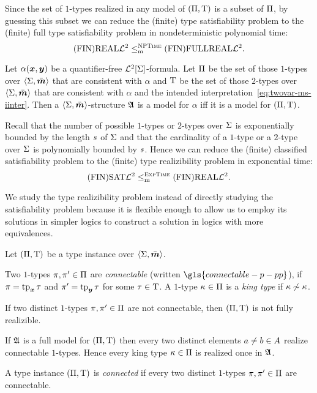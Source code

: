 \begin{remark}\label{rem:red-real-to-full-real}
Since the set of $1$-types realized in any model of $(\Pi,\mathrm{T})$ is a subset
of $\Pi$, by guessing this subset we can reduce the (finite) type
satisfiability problem to the (finite) full type satisfiability problem in
nondeterministic polynomial time:
\[
  \mathrm{(FIN)REAL}\mathcal{L}^{2} \leq_{\mathrm{m}}^{\text{\normalfont{\scshape NPTime}}} \mathrm{(FIN)FULLREAL}\mathcal{L}^{2}.
\]
\end{remark}

\begin{remark}\label{rem:red-sat-to-real}
Let $\alpha(\bm{x},\bm{y})$ be a quantifier-free $\mathcal{L}^{2}[\mathrm{\Sigma}]$-formula. Let $\Pi$ be
the set of those $1$-types over $\left\langle \mathrm{\Sigma},\bar{\bm{m}} \right\rangle$ that are consistent with
$\alpha$ and $\mathrm{T}$ be the set of those $2$-types over $\left\langle \mathrm{\Sigma},\bar{\bm{m}} \right\rangle$ that
are consistent with $\alpha$ and the intended
interpretation~\cref{eq:twovar-ms-iinter}. Then a $\left\langle \mathrm{\Sigma},\bar{\bm{m}} \right\rangle$-structure
$\mathfrak{A}$ is a model for $\alpha$ iff it is a model for $(\Pi,\mathrm{T})$.

Recall that the number of possible $1$-types or $2$-types over $\mathrm{\Sigma}$ is
exponentially bounded by the length $s$ of $\mathrm{\Sigma}$ and that the cardinality
of a $1$-type or a $2$-type over $\mathrm{\Sigma}$ is polynomially bounded by $s$.
Hence we can reduce the (finite) classified satisfiability problem to the
(finite) type realizibility problem in exponential time:
\[
  \mathrm{(FIN)SAT}\mathcal{L}^{2} \leq_{\mathrm{m}}^{\text{\normalfont{\scshape ExpTime}}} \mathrm{(FIN)REAL}\mathcal{L}^{2}.
\]
\end{remark}

We study the type realizibility problem instead of directly studying the
satisfiability problem because it is flexible enough to allow us to employ its
solutions in simpler logics to construct a solution in logics with more
equivalences.

Let $(\Pi,\mathrm{T})$ be a type instance over $\left\langle \mathrm{\Sigma},\bar{\bm{m}} \right\rangle$.
\begin{definition}
Two $1$-types $\pi, {\pi'} \in \Pi$ are \emph{connectable} (written
$\gls{connectable-p-pp}$), if $\pi = \operatorname{tp}_{\bm{x}}\tau$ and ${\pi'} = \operatorname{tp}_{\bm{y}}\tau$ for
some $\tau \in \mathrm{T}$. A $1$-type $\kappa \in \Pi$ is a \emph{king type} if
$\kappa \not\sim \kappa$.
\end{definition}
\begin{remark}\label{rem:twovar-king-once}
If two distinct $1$-types $\pi, {\pi'} \in \Pi$ are not connectable, then
$(\Pi,\mathrm{T})$ is not fully realizible.

If $\mathfrak{A}$ is a full model for $(\Pi,\mathrm{T})$ then every two distinct elements
$a \neq b \in A$ realize connectable $1$-types. Hence every king type
$\kappa \in \Pi$ is realized once in $\mathfrak{A}$.

A type instance $(\Pi,\mathrm{T})$ is \emph{connected} if every two distinct
$1$-types $\pi, {\pi'} \in \Pi$ are connectable.
\end{remark}

